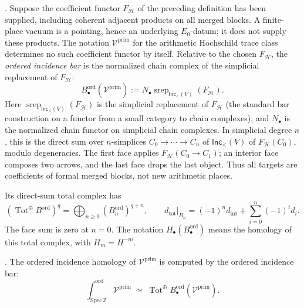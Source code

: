 \begin{definition}
\label{v4-arith:3d-acs:defn:E1-bar}
\ClaimStatusDefinitional. Suppose the coefficient functor
\(F_{\mathcal H}\) of the preceding definition has been supplied,
including coherent adjacent products on all merged blocks. A
finite-place vacuum is a pointing, hence an underlying \(E_0\)-datum;
it does not supply these products. The notation
\(\mathcal V^{\mathrm{prim}}\) for the arithmetic Hochschild trace
class determines no such coefficient functor by itself.
Relative to the chosen \(F_{\mathcal H}\), the
\emph{ordered incidence bar} is the
normalized chain complex of the simplicial replacement of
\(F_{\mathcal H}\):
\begin{equation}
\label{v4-arith:3d-acs:eq:E1-bar}
B^{\mathrm{ord}}_{\bullet}(\mathcal{V}^{\mathrm{prim}})
:=
N_{\bullet}\operatorname{srep}_{\mathsf{Inc}_{<}(V)}(F_{\mathcal H}).
\end{equation}
Here \(\operatorname{srep}_{\mathsf{Inc}_{<}(V)}(F_{\mathcal H})\) is
the simplicial replacement of \(F_{\mathcal H}\) (the standard bar
construction on a functor from a small category to chain complexes),
and \(N_{\bullet}\) is the normalized chain functor on simplicial chain
complexes. In simplicial degree \(n\), this is the direct sum over \(n\)-simplices
\(C_{0}\to\cdots\to C_{n}\) of \(\mathsf{Inc}_{<}(V)\) of
\(F_{\mathcal H}(C_{0})\), modulo degeneracies. The first face
applies \(F_{\mathcal H}(C_0\to C_1)\); an interior face
composes two arrows, and the last face drops the last object.
Thus all targets are coefficients of formal merged blocks, not new
arithmetic places.

Its direct-sum total complex has
\[
 (\operatorname{Tot}^{\oplus}B^{\mathrm{ord}})^q
     =\bigoplus_{n\ge0}(B^{\mathrm{ord}}_n)^{q+n},\qquad
 d_{\mathrm{tot}}|_{B_n}=(-1)^n d_{\mathrm{int}}
                               +\sum_{i=0}^n(-1)^i d_i.
\]
The face sum is zero at \(n=0\). The notation
\(H_\bullet(B^{\mathrm{ord}}_\bullet)\) means the homology of
this total complex, with \(H_m=H^{-m}\).
\end{definition}

\begin{theorem}
\label{v4-arith:3d-acs:thm:chi-hom-bar}
\ClaimStatusProvedHere. The ordered incidence homology of
\(\mathcal{V}^{\mathrm{prim}}\) is computed by the ordered incidence
bar:
\begin{equation}
\label{v4-arith:3d-acs:eq:chi-hom-bar}
\int_{\overline{\mathrm{Spec}\,\mathbb{Z}}}^{\mathrm{ord}}\mathcal{V}^{\mathrm{prim}}
\;\simeq\;
\operatorname{Tot}^{\oplus}
       B^{\mathrm{ord}}_{\bullet}(\mathcal{V}^{\mathrm{prim}}).
\end{equation}
\end{theorem}

